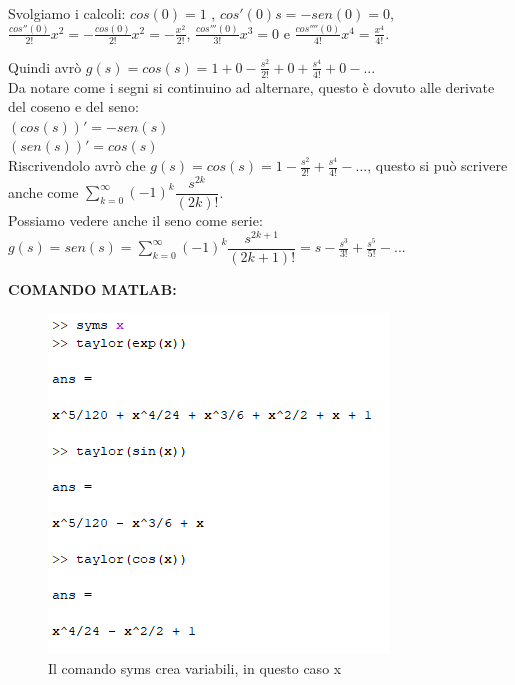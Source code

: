 Svolgiamo i calcoli: $ cos(0) = 1$ , $ cos'(0)s = -sen(0) = 0 $, $\frac{ cos''(0)}{2!} x^2 = - \frac{ cos(0)}{2!} x^2 = - \frac{ x^2}{2!}$, $ \frac{ cos'''(0)}{3!} x^3 = 0 $ e $ \frac{ cos''''(0)}{4!} x^4 = \frac{ x^4}{4!} $.

Quindi avrò $ g(s) = cos(s) = 1 + 0 - \frac{s^2}{2!} + 0 + \frac{s^4}{4!} + 0 -... $\\


Da notare come i segni si continuino ad alternare, questo è dovuto alle derivate del coseno e del seno:\\
$ (cos(s))' = - sen(s)$\\
$ (sen(s))' = cos(s)$\\

Riscrivendolo avrò che $  g(s) = cos(s) = 1 - \frac{s^2}{2!} + \frac{s^4}{4!} -...$, questo si può scrivere anche come $ \sum_{k=0}^\infty (-1)^k \dfrac{s^{2k}}{(2k)!}$. \\

Possiamo vedere anche il seno come serie:\\
$ g(s)=sen(s)= \sum_{k=0}^\infty (-1)^k \dfrac{s^{2k+1}}{(2k+1)!} = s - \frac{s^3}{3!}+\frac{s^5}{5!}-...$

\pagebreak

\textbf{COMANDO MATLAB:}\\

\begin{figure}[h]
	\centering
	\includegraphics{immagini/comando1}
	\caption{ Il comando syms crea variabili, in questo caso x }
	\label{fig: Primo comando Matlab}
\end{figure}

